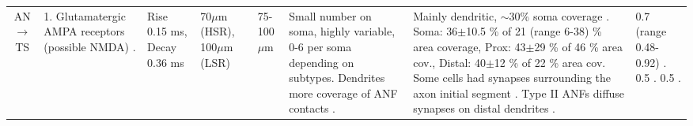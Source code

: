 \begin{longtable}{cYYYYYYY}
AN\ensuremath{\rightarrow}TS                       
& %
1. Glutamatergic AMPA receptors (possible NMDA) \citep{FerragamoGoldingEtAl:1998a}. 
& %
Rise 0.15 ms,  Decay 0.36 ms \citep{GardnerTrussellEtAl:1999}
& %
70$\mu$m (HSR), 100$\mu$m (LSR)  \citep{CantBenson:2003,RyugoParks:2003}
& %
75-100$\mu$m \citep[Mouse]{OertelWuEtAl:1990} 
& %
Small number on soma, highly variable, 0-6 per soma depending on subtypes. Dendrites more coverage of ANF contacts \citep{Cant:1981,FayPopper:1994,ReddCahillEtAl:2002,RyugoWrigthEtAl:1993,Ryugo:1992,RyugoParks:2003,FerragamoGoldingEtAl:1998a,SmithRhode:1989,JosephsonMorest:1998}.
& %
Mainly dendritic, $\sim$30\% soma coverage \citep[Cat][]{Cant:1981,Cant:1982,RyugoWrightEtAl:1993,TolbertMorest:1982a}. 
Soma: 36$\pm$10.5 \%  of 21 (range 6-38) \% area coverage, Prox: 43$\pm$29 \%  of 46 \% area cov., Distal: 40$\pm$12 \%  of 22 \% area cov. \citep[cat][]{SmithRhode:1989}
Some cells had synapses surrounding the axon initial segment \citep[chinchilla][]{JosephsonMorest:1998}. 
Type II ANFs diffuse synapses on distal dendrites \citep[mouse][]{BensonBrown:2004}.
& %
0.7 (range 0.48-0.92) \citep[Mouse][]{FerragamoGoldingEtAl:1998a,Oertel:1983}. 
0.5  \citep[theoretical][]{Brown:1993,BrownLedwith:1990}.
0.5  \citep[Chinchilla][]{WickesbergOertel:1993}. 


\end{longtable}
